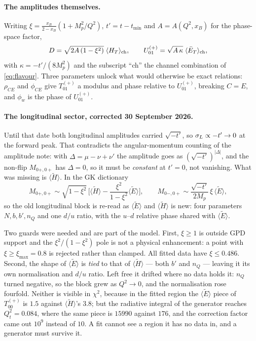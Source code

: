 \paragraph{The amplitudes themselves.}
Writing $\xi = \frac{x_B}{2-x_B}\left(1 + M_p^2/Q^2\right)$,
$t' = t - t_{\min}$ and $A = A(Q^2,x_B)$ for the phase-space factor,
\begin{equation}
D = \sqrt{2A\,(1-\xi^2)}\;\langle H_T\rangle_{\rm ch}, \qquad
U_{01}^{(+)} = \sqrt{A\,\kappa}\;\langle \bar E_T\rangle_{\rm ch},
\label{eq:amps}
\end{equation}
with $\kappa = -t'/(8M_p^2)$ and the subscript ``ch'' the channel combination
of \eqref{eq:flavour}.  Three parameters unlock what would otherwise be exact
relations: $\rho_{CE}$ and $\phi_{CE}$ give $T_{01}^{(+)}$ a modulus and phase
relative to $U_{01}^{(+)}$, breaking $C = E$, and $\phi_w$ is the phase of
$U_{01}^{(+)}$.

\paragraph{The longitudinal sector, corrected 30 September 2026.}
\label{par:htilde}
Until that date both longitudinal amplitudes carried $\sqrt{-t'}$, so
$\sigma_{L} \propto -t' \to 0$ at the forward peak.  That contradicts the
angular-momentum counting of the amplitude note: with
$\Delta = \mu - \nu + \nu'$ the amplitude goes as $(\sqrt{-t'})^{|\Delta|}$,
and the non-flip $M_{0+,0+}$ has $\Delta = 0$, so it must be
\emph{constant} at $t' = 0$, not vanishing.  What was missing is
$\langle\tilde H\rangle$.  In the GK dictionary
\begin{equation}
M_{0+,0+} \sim \sqrt{1-\xi^2}\,
\Big[\langle\tilde H\rangle - \frac{\xi^2}{1-\xi^2}\langle\tilde E\rangle\Big],
\qquad
M_{0-,0+} \sim \frac{\sqrt{-t'}}{2M_p}\,\xi\,\langle\tilde E\rangle ,
\label{eq:longi}
\end{equation}
so the old longitudinal block is re-read as $\langle\tilde E\rangle$ and
$\langle\tilde H\rangle$ is new: four parameters $N, b, b', n_Q$ and one $d/u$
ratio, with the $u$--$d$ relative phase shared with $\langle\tilde E\rangle$.

Two guards were needed and are part of the model.  First, $\xi \ge 1$ is
outside GPD support and the $\xi^2/(1-\xi^2)$ pole is not a physical
enhancement: a point with $\xi \ge \xi_{\max} = 0.8$ is rejected rather than
clamped.  All fitted data have $\xi \le 0.486$.  Second, the shape of
$\langle\tilde E\rangle$ is \emph{tied} to that of $\langle\tilde H\rangle$ ---
both $b'$ and $n_Q$ --- leaving it its own normalisation and $d/u$ ratio.  Left
free it drifted where no data holds it: $n_Q$ turned negative, so the block grew
as $Q^2 \to 0$, and the normalisation rose fourfold.  Neither is visible in
$\chi^2$, because in the fitted region the $\langle\tilde E\rangle$ piece of
$T_{00}^{(+)}$ is $1.5$ against $\langle\tilde H\rangle$'s $3.8$; but the
radiative integral of the generator reaches $Q^2_t = 0.084$, where the same
piece is $15990$ against $176$, and the correction factor came out $10^9$
instead of $10$.  A fit cannot see a region it has no data in, and a generator
must survive it.

